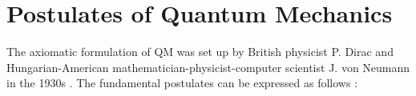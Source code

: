 \documentclass[../../master.tex]{subfiles}
\begin{document}






\section{Postulates of Quantum Mechanics \label{postulates}}
The axiomatic formulation of QM was set up by British physicist P. Dirac and Hungarian-American mathematician-physicist-computer scientist J. von Neumann in the 1930s \cite{salasnich}. The fundamental postulates can be expressed as follows \cite{fys4110}:
\end{document}
